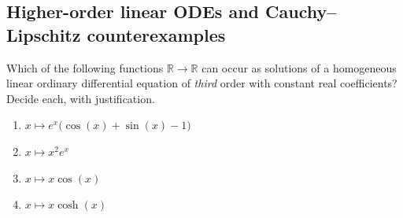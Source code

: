 \subsection{Higher-order linear ODEs and Cauchy--Lipschitz counterexamples}
\label{sec:higher_order_odes_counterexample}

\begin{exercise}
\label{ex:which_functions_solve_a_third_order_ode}
Which of the following functions $\mathbb{R} \to \mathbb{R}$ can occur as solutions of a
homogeneous linear ordinary differential equation of \emph{third} order with constant real
coefficients? Decide each, with justification.
\begin{enumerate}[label=\textbf{(\alph*)}]
  \item $x \mapsto e^x\big(\cos(x) + \sin(x) - 1\big)$
  \item $x \mapsto x^2e^x$
  \item $x \mapsto x\cos(x)$
  \item $x \mapsto x\cosh(x)$
\end{enumerate}
\end{exercise}

